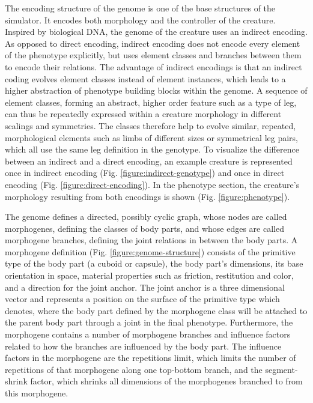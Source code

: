 \documentclass[main]{subfiles}
\begin{document}
The encoding structure of the genome is one of the base structures of the simulator. %
%
It encodes both morphology and the controller of the creature. %
%
Inspired by biological DNA, the genome of the creature uses an indirect encoding. %
%
As opposed to direct encoding, indirect encoding does not encode every element of the phenotype explicitly, but uses element classes and branches between them to encode their relations. %
%
The advantage of indirect encodings is that an indirect coding evolves element classes instead of element instances, which leads to a higher abstraction of phenotype building blocks within the genome. %
%
A sequence of element classes, forming an abstract, higher order feature such as a type of leg, can thus be repeatedly expressed within a creature morphology in different scalings and symmetries. %
%
The classes therefore help to evolve similar, repeated, morphological elements such as limbs of different sizes or symmetrical leg pairs, which all use the same leg definition in the genotype. %
%
To visualize the difference between an indirect and a direct encoding, an example creature is represented once in indirect encoding (Fig. \ref{figure:indirect-genotype}) and once in direct encoding (Fig. \ref{figure:direct-encoding}). %
%
In the phenotype section, the creature's morphology resulting from both encodings is shown (Fig. \ref{figure:phenotype}). %

The genome defines a directed, possibly cyclic graph, whose nodes are called morphogenes, defining the classes of body parts, and whose edges are called morphogene branches, defining the joint relations in between the body parts. %
%
A morphogene definition (Fig. \ref{figure:genome-structure}) consists of the primitive type of the body part (a cuboid or capsule), the body part's dimensions, its base orientation in space, material properties such as friction, restitution and color, and a direction for the joint anchor. %
%
The joint anchor is a three dimensional vector and represents a position on the surface of the primitive type which denotes, where the body part defined by the morphogene class will be attached to the parent body part through a joint in the final phenotype. %
%
Furthermore, the morphogene contains a number of morphogene branches and influence factors related to how the branches are influenced by the body part. %
%
The influence factors in the morphogene are the repetitions limit, which limits the number of repetitions of that morphogene along one top-bottom branch, and the segment-shrink factor, which shrinks all dimensions of the morphogenes branched to from this morphogene.
\end{document}
